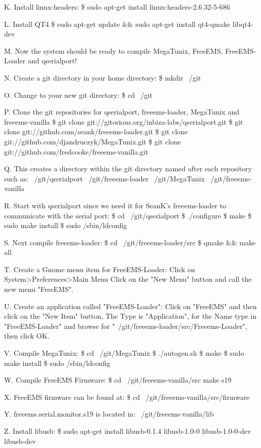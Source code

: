 \documentclass[12pt,notitlepage,onecolumn,oneside,openany,draft]{memoir}
\begin{document}
K. Install linux-headers:
	\$ sudo apt-get install linux-headers-2.6.32-5-686

L. Install QT4
	\$ sudo apt-get update && sudo apt-get install qt4-qmake libqt4-dev

M. Now the system should be ready to compile MegaTunix, FreeEMS, FreeEMS-Loader and qserialport!

N. Create a git directory in your home directory:
	\$ mkdir ~/git

O. Change to your new git directory:
	\$ cd ~/git

P. Clone the git repositories for qserialport, freeems-loader, MegaTunix and freeems-vanilla
	\$ git clone git://gitorious.org/inbiza-labs/qserialport.git
	\$ git clone git://github.com/seank/freeems-loader.git
	\$ git clone git://github.com/djandruczyk/MegaTunix.git
	\$ git clone git://github.com/fredcooke/freeems-vanilla.git

Q. This creates a directory within the git directory named after each repository such as:
	~/git/qserialport	
	~/git/freeems-loader
	~/git/MegaTunix
	~/git/freeems-vanilla

R. Start with qserialport since we need it for SeanK's freeems-loader to communicate with the serial port:
	\$ cd ~/git/qserialport
	\$ ./configure
	\$ make
	\$ sudo make install
	\$ sudo /sbin/ldconfig

S. Next compile freeems-loader:
	\$ cd ~/git/freeems-loader/src
	\$ qmake && make all

T. Create a Gnome menu item for FreeEMS-Loader:
	Click on System>Preferences>Main Menu
	Click on the "New Menu" button and call the new menu "FreeEMS".

U. Create an application called "FreeEMS-Loader":
	Click on "FreeEMS" and then click on the "New Item" button,
	The Type is "Application", for the Name type in "FreeEMS-Loader" and browse for 
	"~/git/freeems-loader/src/Freeems-Loader", then click OK.

V. Compile MegaTunix:
	\$ cd ~/git/MegaTunix
	\$ ./autogen.sh
	\$ make
	\$ sudo make install
	\$ sudo /sbin/ldconfig

W. Compile FreeEMS Firmware:
	\$ cd ~/git/freeems-vanilla/src
	make s19

X. FreeEMS firmware can be found at:
	\$ cd ~/git/freeems-vanilla/src/firmware

Y. freeems.serial.monitor.s19 is located in:
	~/git/freeems-vanilla/lib

Z. Install libusb:
	\$ sudo apt-get install libusb-0.1.4 libusb-1.0-0 libusb-1.0-0-dev libusb-dev
\end{document}
